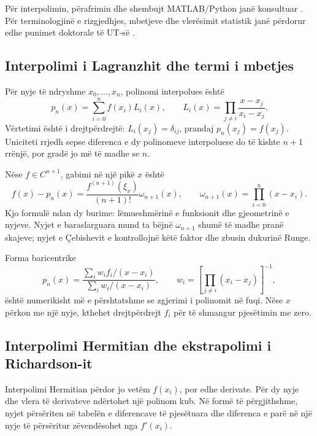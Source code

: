 \documentclass[11pt,oneside,openany]{book}
\begin{document}
Për interpolimin, përafrimin dhe shembujt MATLAB/Python janë konsultuar \cite{hanelli,hoxha,datja}. Për terminologjinë e rizgjedhjes, mbetjeve dhe vlerësimit statistik janë përdorur edhe punimet doktorale të UT-së \cite{butka,tasho}.



\subsection{Interpolimi i Lagranzhit dhe termi i mbetjes}
Për nyje të ndryshme $x_0,\ldots,x_n$, polinomi interpolues është
\begin{equation}
 p_n(x)=\sum_{i=0}^{n}f(x_i)L_i(x),\qquad
 L_i(x)=\prod_{j\ne i}\frac{x-x_j}{x_i-x_j}.
\end{equation}
Vërtetimi është i drejtpërdrejtë: $L_i(x_j)=\delta_{ij}$, prandaj $p_n(x_j)=f(x_j)$. Uniciteti rrjedh sepse diferenca e dy polinomeve interpoluese do të kishte $n+1$ rrënjë, por gradë jo më të madhe se $n$.

Nëse $f\in C^{n+1}$, gabimi në një pikë $x$ është
\begin{equation}
 f(x)-p_n(x)=\frac{f^{(n+1)}(\xi_x)}{(n+1)!}
 \omega_{n+1}(x),\qquad
 \omega_{n+1}(x)=\prod_{i=0}^{n}(x-x_i).
\end{equation}
Kjo formulë ndan dy burime: lëmueshmërinë e funksionit dhe gjeometrinë e nyjeve. Nyjet e baraslarguara mund ta bëjnë $\omega_{n+1}$ shumë të madhe pranë skajeve; nyjet e Çebishevit e kontrollojnë këtë faktor dhe zbusin dukurinë Runge.

Forma baricentrike
\begin{equation}
 p_n(x)=\frac{\sum_i w_i f_i/(x-x_i)}{\sum_i w_i/(x-x_i)},
 \qquad w_i=\left[\prod_{j\ne i}(x_i-x_j)\right]^{-1},
\end{equation}
është numerikisht më e përshtatshme se zgjerimi i polinomit në fuqi. Nëse $x$ përkon me një nyje, kthehet drejtpërdrejt $f_i$ për të shmangur pjesëtimin me zero.

\subsection{Interpolimi Hermitian dhe ekstrapolimi i Richardson-it}
Interpolimi Hermitian përdor jo vetëm $f(x_i)$, por edhe derivate. Për dy nyje dhe vlera të derivateve ndërtohet një polinom kub. Në formë të përgjithshme, nyjet përsëriten në tabelën e diferencave të pjesëtuara dhe diferenca e parë në një nyje të përsëritur zëvendësohet nga $f'(x_i)$.
\end{document}
